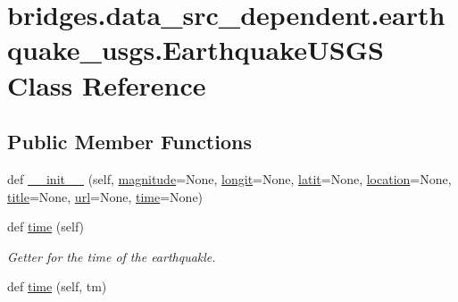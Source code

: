 \hypertarget{classbridges_1_1data__src__dependent_1_1earthquake__usgs_1_1_earthquake_u_s_g_s}{}\section{bridges.\+data\+\_\+src\+\_\+dependent.\+earthquake\+\_\+usgs.\+Earthquake\+U\+S\+GS Class Reference}
\label{classbridges_1_1data__src__dependent_1_1earthquake__usgs_1_1_earthquake_u_s_g_s}
\subsection*{Public Member Functions}
\begin{DoxyCompactItemize}
\item 
def \hyperlink{classbridges_1_1data__src__dependent_1_1earthquake__usgs_1_1_earthquake_u_s_g_s_abddcbcfdc6985d7b95f3ce780b53b344}{\+\_\+\+\_\+init\+\_\+\+\_\+} (self, \hyperlink{classbridges_1_1data__src__dependent_1_1earthquake__usgs_1_1_earthquake_u_s_g_s_a2ada4ba221f09e4fd249ba53f5647d61}{magnitude}=None, \hyperlink{classbridges_1_1data__src__dependent_1_1earthquake__usgs_1_1_earthquake_u_s_g_s_a98a8f3ee07d05b57c5028b2bad8be9bf}{longit}=None, \hyperlink{classbridges_1_1data__src__dependent_1_1earthquake__usgs_1_1_earthquake_u_s_g_s_ab582eb6b2e8836e10c35f60e14d128d0}{latit}=None, \hyperlink{classbridges_1_1data__src__dependent_1_1earthquake__usgs_1_1_earthquake_u_s_g_s_a3b8f61c92ee3c13d3cd54bc264378882}{location}=None, \hyperlink{classbridges_1_1data__src__dependent_1_1earthquake__usgs_1_1_earthquake_u_s_g_s_a7b46d73e199b4cf4f9b1253f89727abe}{title}=None, \hyperlink{classbridges_1_1data__src__dependent_1_1earthquake__usgs_1_1_earthquake_u_s_g_s_a449a372a14b288f7fd71066fb3886cd1}{url}=None, \hyperlink{classbridges_1_1data__src__dependent_1_1earthquake__usgs_1_1_earthquake_u_s_g_s_aacc317fa18e83353df6c8ffb3d47d6c1}{time}=None)
\item 
def \hyperlink{classbridges_1_1data__src__dependent_1_1earthquake__usgs_1_1_earthquake_u_s_g_s_af978827a241b6906c639194e48ed10df}{time} (self)
\begin{DoxyCompactList}\small\item\em Getter for the time of the earthquakle. \end{DoxyCompactList}\item 
def \hyperlink{classbridges_1_1data__src__dependent_1_1earthquake__usgs_1_1_earthquake_u_s_g_s_ac0c0fdf4e37183ad46765019f16ee9ef}{time} (self, tm)

\end{DoxyCompactItemize}
